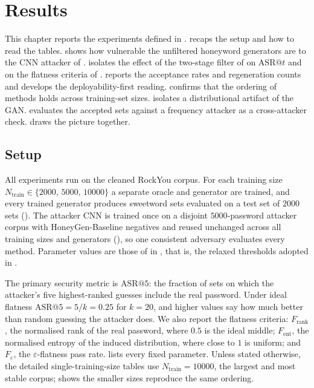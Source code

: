 \chapter{Results}
\label{ch:results}

This chapter reports the experiments defined in
.  recaps the setup
and how to read the tables.  shows how
vulnerable the unfiltered honeyword generators are to the CNN attacker
of .  isolates the effect
of the two-stage filter of  on
$\mathrm{ASR}@t$ and on the flatness criteria of
.  reports the
acceptance rates and regeneration counts and develops the
deployability-first reading.  confirms that the
ordering of methods holds across training-set sizes.
 isolates a distributional artifact of the GAN.
 evaluates the accepted sets against a frequency
attacker as a cross-attacker check.  draws
the picture together.

\section{Setup}
\label{sec:results-setup}

All experiments run on the cleaned RockYou corpus. For each training
size $N_{\text{train}} \in \{2000,\,5000,\,10000\}$ a separate oracle
and generator are trained, and every trained generator produces
sweetword sets evaluated on a test set of $2000$ sets
(). The attacker CNN is trained once on a
disjoint $5000$-password attacker corpus with HoneyGen-Baseline
negatives and reused unchanged across all training sizes and generators
(), so one consistent adversary evaluates every
method. Parameter values are those of  in
, that is, the relaxed thresholds adopted in
.

The primary security metric is $\mathrm{ASR}@5$: the fraction of sets on
which the attacker's five highest-ranked guesses include the real
password. Under ideal flatness $\mathrm{ASR}@5 = 5/k = 0.25$ for
$k = 20$, and higher values say how much better than random guessing the
attacker does. We also report the flatness criteria: $F_{\text{rank}}$,
the normalised rank of the real password, where $0.5$ is the ideal
middle; $F_{\text{ent}}$, the normalised entropy of the induced
distribution, where close to $1$ is uniform; and $F_{\varepsilon}$, the
$\varepsilon$-flatness pass rate.  lists every fixed
parameter. Unless stated otherwise, the detailed single-training-size
tables use $N_{\text{train}} = 10000$, the largest and most stable
corpus;  shows the smaller sizes reproduce the
same ordering.


